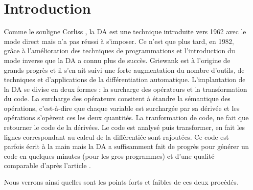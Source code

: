 

\section{Introduction}
{\co Comme le souligne Corliss \cite{Corliss1991b}, la DA est une technique introduite vers 1962 avec le mode direct mais n'a pas r\'eussi \`a s'imposer.
 Ce n'est que plus tard, en 1982, grâce \`a l'am\'elioration des techniques de programmations et l'introduction du mode inverse que la DA a
 connu plus de succ\`es.
Griewank est \`a l'origine de grands progr\`es et il s'en ait suivi une forte augmentation du nombre d'outils, de techniques et d'applications 
de la diff\'erentiation automatique. 
L'implantation de la DA se divise en deux formes : la surcharge des op\'erateurs et la transformation du code.
La surcharge des op\'erateurs consitent \`a \'etandre la s\'emantique des op\'erations, c'est-\`a-dire que chaque variable est surcharg\'ee
par sa d\'eriv\'ee et les op\'erations s'op\`erent ces les deux quantit\'es. }
La tranformation de code, ne fait que retourner le code de la d\'eriv\'ees. Le code est analys\'e puis transformer, en fait les lignes 
correspondant au calcul de la diff\'erenti\'ee sont rajout\'ees. Ce code est parfois \'ecrit \`a la main mais la DA a suffisamment fait de progr\`es pour g\'en\'erer un code en quelques minutes (pour les gros programmes) et 
d'une qualit\'e comparable d'apr\`es l'article \cite{diffautoopa}.

 Nous verrons ainsi quelles sont les points forts et faibles de ces deux
proc\'ed\'es.





%

